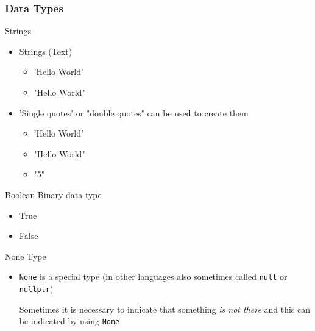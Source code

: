 \documentclass[10pt, a4paper]{beamer} %
\begin{document}
\begin{frame}[c, allowframebreaks]\frametitle{Data Types}
	\begin{block}{Strings}
		\begin{itemize}
			\item Strings (Text)
			      \begin{itemize}
				      \item {\color{blue}'Hello World'}
				      \item {\color{red}"Hello World"}
			      \end{itemize}
			\item {\color{blue} 'Single quotes'} or {\color{red} "double quotes"} can be used to create them
			      \begin{itemize}
				      \item 'Hello World'
				      \item "Hello World"
				      \item "5"
			      \end{itemize}
		\end{itemize}
	\end{block}
	\begin{block}{Boolean}
		Binary data type
		\begin{itemize}
			\item True
			\item False
		\end{itemize}
	\end{block}
	\begin{block}{None Type}
		\begin{itemize}
			\item \texttt{None} is a special type (in other languages also sometimes called \texttt{null} or \texttt{nullptr})

			      Sometimes it is necessary to indicate that something \textit{is not there} and this can be indicated by using \texttt{None}
		\end{itemize}
	\end{block}


\end{frame}
\end{document}
